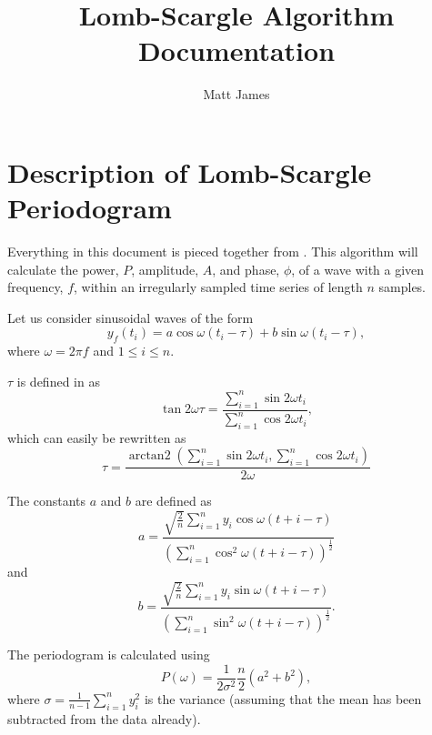 \documentclass[a4paper,10pt]{article}
\title{Lomb-Scargle Algorithm Documentation}
\author{Matt James}
\date{}
\DeclareMathOperator{\atantwo}{arctan2}
\begin{document}
\maketitle
	
\section{Description of Lomb-Scargle Periodogram}

Everything in this document is pieced together from \citet{Lomb1976,Scargle1983,Hocke1998}. This algorithm will calculate the power, $P$, amplitude, $A$, and phase, $\phi$, of a wave with a given frequency, $f$, within an irregularly sampled time series of length $n$ samples.

Let us consider sinusoidal waves of the form 
\begin{equation}
	y_f(t_i) = a \cos{\omega(t_i - \tau)} + b \sin{\omega(t_i - \tau)}, \label{EqWave}
\end{equation}
where $\omega = 2 \pi f$ and $1 \le i \le n$.

$\tau$ is defined in \citet{Scargle1983} as
\begin{equation}
	\tan{2 \omega \tau} = \frac{\sum_{i=1}^{n} \sin{2 \omega t_i}}{\sum_{i=1}^{n} \cos{2 \omega t_i}},
\end{equation}
which can easily be rewritten as
\begin{equation}
	\tau = \frac{\atantwo{\left( \sum_{i=1}^{n} \sin{2 \omega t_i}, \sum_{i=1}^{n} \cos{2 \omega t_i} \right)}}{2 \omega}
\end{equation}

The constants $a$ and $b$ are defined as
\begin{equation}
	a = \frac{\sqrt{\frac{2}{n}}\sum_{i=1}^{n}y_i \cos{\omega (t+i - \tau)}}{\left( \sum_{i=1}^{n} \cos^2{\omega (t+i - \tau)} \right)^{\frac{1}{2}}}
\end{equation}
and
\begin{equation}
b = \frac{\sqrt{\frac{2}{n}}\sum_{i=1}^{n}y_i \sin{\omega (t+i - \tau)}}{\left( \sum_{i=1}^{n} \sin^2{\omega (t+i - \tau)} \right)^{\frac{1}{2}}}.
\end{equation}

The periodogram is calculated using 
\begin{equation}
	P(\omega) = \frac{1}{2\sigma^2}\frac{n}{2} (a^2 + b^2),
\end{equation}
where $\sigma = \frac{1}{n-1}\sum_{i=1}^{n} y_i^2$ is the variance (assuming that the mean has been subtracted from the data already).
\end{document}
